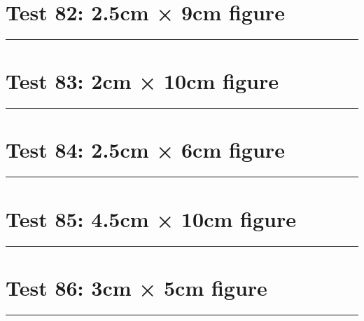 \documentclass[a4paper,11pt]{article}
\begin{document}
\section*{Test 82: 2.5cm × 9cm figure}
\begin{swarmwrap}%
  \begin{minipage}[t]{2cm}
    \centering
    \rule{\linewidth}{9cm}
  \end{minipage}%
\end{swarmwrap}%
\swarmwrapnext
\lipsum[137]
\lipsum[138]
\lipsum[139]
\lipsum[140]
\lipsum[141]
\section*{Test 83: 2cm × 10cm figure}
\begin{swarmwrap}%
  \begin{minipage}[t]{2cm}
    \centering
    \rule{\linewidth}{10cm}
  \end{minipage}%
\end{swarmwrap}%
\swarmwrapnext
\lipsum[28]
\lipsum[29]
\lipsum[30]
\lipsum[31]
\lipsum[32]
\section*{Test 84: 2.5cm × 6cm figure}
\begin{swarmwrap}%
  \begin{minipage}[t]{2cm}
    \centering
    \rule{\linewidth}{6cm}
  \end{minipage}%
\end{swarmwrap}%
\swarmwrapnext
\lipsum[29]
\lipsum[30]
\lipsum[31]
\section*{Test 85: 4.5cm × 10cm figure}
\begin{swarmwrap}%
  \begin{minipage}[t]{4cm}
    \centering
    \rule{\linewidth}{10cm}
  \end{minipage}%
\end{swarmwrap}%
\swarmwrapnext
\lipsum[71]
\lipsum[72]
\lipsum[73]
\lipsum[74]
\section*{Test 86: 3cm × 5cm figure}
\begin{swarmwrap}%
  \begin{minipage}[t]{3cm}
    \centering
    \rule{\linewidth}{5cm}
  \end{minipage}%
\end{swarmwrap}%
\swarmwrapnext
\lipsum[54]
\lipsum[55]
\lipsum[56]
\lipsum[57]
\lipsum[58]
\end{document}
